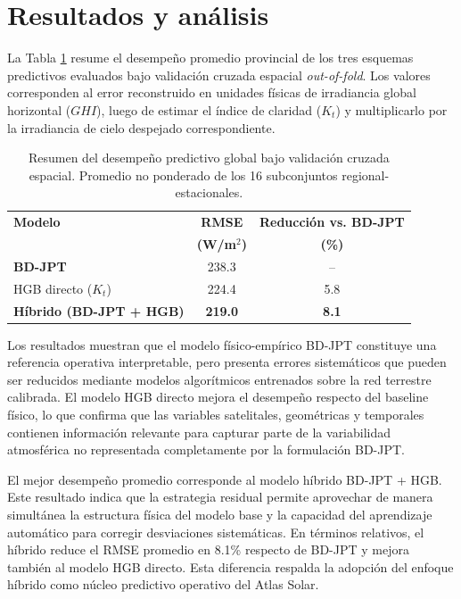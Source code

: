 \documentclass[../main.tex]{subfiles}
\begin{document}
\section{Resultados y análisis}

La Tabla \ref{tab:resumen_metodologico} resume el desempeño promedio provincial de los tres esquemas predictivos evaluados bajo validación cruzada espacial \textit{out-of-fold}. Los valores corresponden al error reconstruido en unidades físicas de irradiancia global horizontal ($GHI$), luego de estimar el índice de claridad ($K_t$) y multiplicarlo por la irradiancia de cielo despejado correspondiente.

\begin{table}[htpb]
\centering
\caption{Resumen del desempeño predictivo global bajo validación cruzada espacial. Promedio no ponderado de los 16 subconjuntos regional-estacionales.}
\label{tab:resumen_metodologico}

\footnotesize
\setlength{\tabcolsep}{3pt}
\renewcommand{\arraystretch}{1.15}

\begin{tabularx}{\textwidth}{@{}Xcc@{}}
\toprule
\textbf{Modelo} &
\textbf{RMSE} &
\textbf{Reducción vs. BD-JPT} \\
&
\textbf{(W/m$^2$)} &
\textbf{(\%)} \\
\midrule
\textbf{BD-JPT} & 238.3 & -- \\
HGB directo ($K_t$) & 224.4 & 5.8 \\
\textbf{Híbrido (BD-JPT + HGB)} & \textbf{219.0} & \textbf{8.1} \\
\bottomrule
\end{tabularx}
\end{table}

Los resultados muestran que el modelo físico-empírico BD-JPT constituye una referencia operativa interpretable, pero presenta errores sistemáticos que pueden ser reducidos mediante modelos algorítmicos entrenados sobre la red terrestre calibrada. El modelo HGB directo mejora el desempeño respecto del baseline físico, lo que confirma que las variables satelitales, geométricas y temporales contienen información relevante para capturar parte de la variabilidad atmosférica no representada completamente por la formulación BD-JPT.

El mejor desempeño promedio corresponde al modelo híbrido BD-JPT + HGB. Este resultado indica que la estrategia residual permite aprovechar de manera simultánea la estructura física del modelo base y la capacidad del aprendizaje automático para corregir desviaciones sistemáticas. En términos relativos, el híbrido reduce el RMSE promedio en 8.1\% respecto de BD-JPT y mejora también al modelo HGB directo. Esta diferencia respalda la adopción del enfoque híbrido como núcleo predictivo operativo del Atlas Solar.
\end{document}
